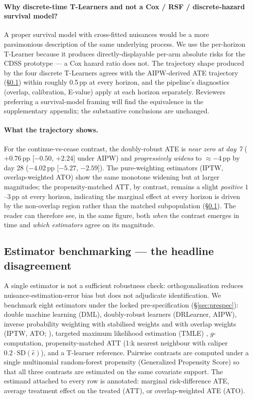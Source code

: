 \documentclass[11pt,a4paper]{article}
\begin{document}
\paragraph{Why discrete-time T-Learners and not a Cox / RSF / discrete-hazard survival model?} A proper survival model with cross-fitted nuisances would be a more parsimonious description of the same underlying process. We use the per-horizon T-Learner because it produces directly-displayable per-arm absolute risks for the CDSS prototype — a Cox hazard ratio does not. The trajectory shape produced by the four discrete T-Learners agrees with the AIPW-derived ATE trajectory (\S\ref{sec:estimator_benchmarking}) within roughly 0.5\,pp at every horizon, and the pipeline's diagnostics (overlap, calibration, E-value) apply at each horizon separately. Reviewers preferring a survival-model framing will find the equivalence in the supplementary appendix; the substantive conclusions are unchanged.

\paragraph{What the trajectory shows.} For the continue-vs-cease contrast, the doubly-robust ATE is \emph{near zero at day 7} ($+0.76$\,pp [$-0.50$, $+2.24$] under AIPW) and \emph{progressively widens} to $\approx -4$\,pp by day 28 ($-4.02$\,pp [$-5.27$, $-2.59$]). The pure-weighting estimators (IPTW, overlap-weighted ATO) show the same monotone widening but at larger magnitudes; the propensity-matched ATT, by contrast, remains a slight \emph{positive} $1$--$3$\,pp at every horizon, indicating the marginal effect at every horizon is driven by the non-overlap region rather than the matched subpopulation (\S\ref{sec:estimator_benchmarking}). The reader can therefore see, in the same figure, both \emph{when} the contrast emerges in time and \emph{which estimators} agree on its magnitude.

\subsection{Estimator benchmarking --- the headline disagreement}
\label{sec:estimator_benchmarking}

A single estimator is not a sufficient robustness check: orthogonalisation reduces nuisance-estimation-error bias but does not adjudicate identification. We benchmark eight estimators under the locked pre-specification (\S\ref{sec:prespec}): double machine learning (DML), doubly-robust learners (DRLearner, AIPW), inverse probability weighting with stabilised weights and with overlap weights (IPTW, ATO; \cite{li2018overlap}), targeted maximum likelihood estimation (TMLE) \cite{vanderlaan2011tmle}, $g$-computation, propensity-matched ATT (1:k nearest neighbour with caliper $0.2 \cdot \mathrm{SD}(\hat e)$), and a T-learner reference. Pairwise contrasts are computed under a single multinomial random-forest propensity (Generalized Propensity Score) so that all three contrasts are estimated on the same covariate support. The estimand attached to every row is annotated: marginal risk-difference ATE, average treatment effect on the treated (ATT), or overlap-weighted ATE (ATO).
\end{document}
